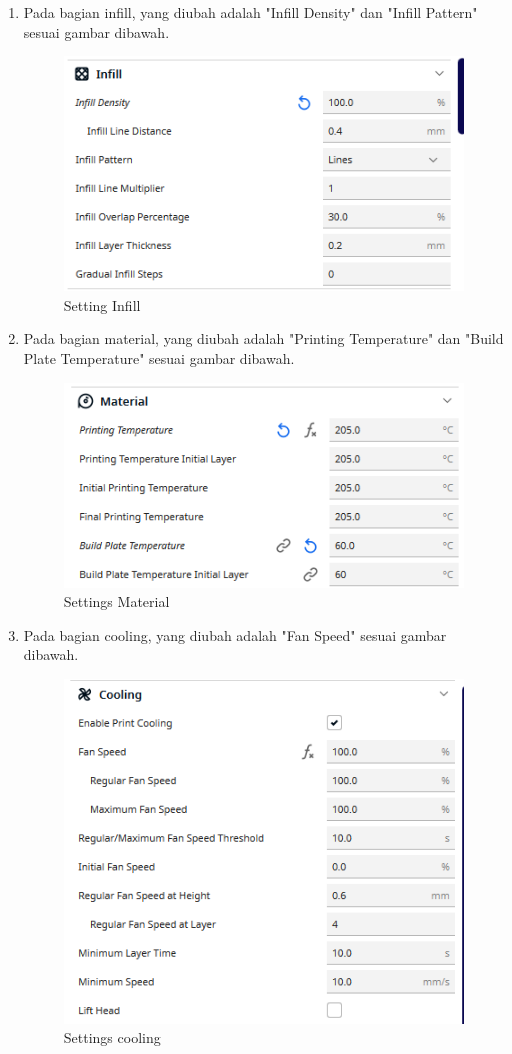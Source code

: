 \begin{enumerate}
    \item Pada bagian infill, yang diubah adalah "Infill Density" dan "Infill Pattern" sesuai gambar dibawah.
    \begin{figure}[H]
        \centering
        \includegraphics[width=0.5\linewidth]{P3/img/Settings infill.png}
        \caption{Setting Infill}
        \label{fig:Settings Infill}
    \end{figure}
    \item Pada bagian material, yang diubah adalah "Printing Temperature" dan "Build Plate Temperature" sesuai gambar dibawah.
    \begin{figure}[H]
        \centering
        \includegraphics[width=0.5\linewidth]{P3/img/Settings material.png}
        \caption{Settings Material}
        \label{fig:Settings Material}
    \end{figure}
    \item Pada bagian cooling, yang diubah adalah "Fan Speed" sesuai gambar dibawah.
    \begin{figure}[H]
        \centering
        \includegraphics[width=0.5\linewidth]{P3/img/Settings cooling.png}
        \caption{Settings cooling}
        \label{fig:Settings Cooling}
    \end{figure}

\end{enumerate}
